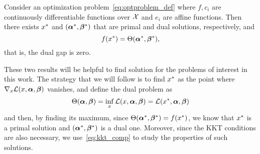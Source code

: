 \begin{theorem}\label{th:strong_duality}
    Consider an optimization problem~\eqref{eq:optproblem_def} where $f, c_i$ are continuously differentiable functions over $\mathcal{X}$ and $e_i$ are affine functions. Then there exists ${x}^*$ and $({\bm{\alpha}}^*, {\bm{\beta}}^*)$ that are primal and dual solutions, respectively, and
    $$ f({x}^*) = \Theta({\bm{\alpha}}^*, {\bm{\beta}}^*), $$
    that is, the dual gap is zero.
\end{theorem}
These two results will be helpful to find solution for the problems of interest in this work. The strategy that we will follow is to find ${x}^*$ as the point where $\nabla_x \mathcal{L}(x, \bm{\alpha}, \bm{\beta}) $ vanishes, and define the dual problem as
\begin{equation}
    \nonumber
    \Theta(\bm{\alpha}, \bm{\beta}) = \inf_{x} \mathcal{L}(x, \bm{\alpha}, \bm{\beta}) =  \mathcal{L}({x}^*, \bm{\alpha}, \bm{\beta}) 
\end{equation}
and then, by finding its maximum, since $\Theta({\bm{\alpha}}^*, {\bm{\beta}}^*) = f({x}^*)$, we know that ${x}^*$ is a primal solution and $({\bm{\alpha}}^*, {\bm{\beta}}^*)$ is a dual one. Moreover, since the KKT conditions are also necessary, we use~\eqref{eq:kkt_comp} to study the properties of such solutions.



